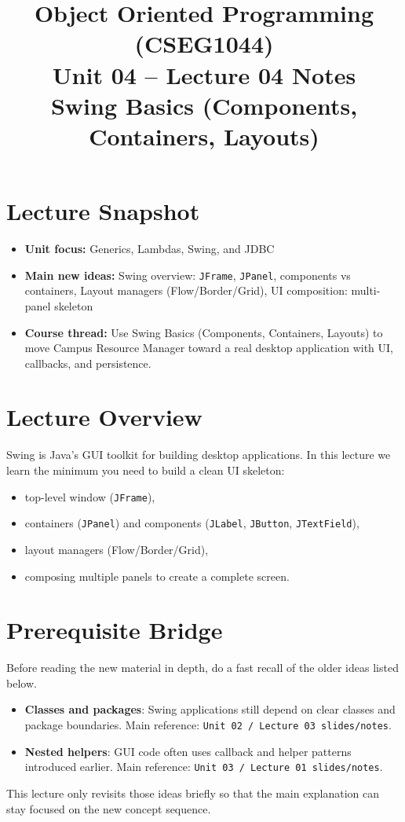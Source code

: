 \documentclass[11pt]{article}
\title{Object Oriented Programming (CSEG1044)\\Unit 04 -- Lecture 04 Notes\\Swing Basics (Components, Containers, Layouts)}
\begin{document}
\maketitle
\tableofcontents

\section{Lecture Snapshot}
\begin{itemize}
  \item \textbf{Unit focus:} Generics, Lambdas, Swing, and JDBC
  \item \textbf{Main new ideas:} Swing overview: \texttt{JFrame}, \texttt{JPanel}, components vs containers, Layout managers (Flow/Border/Grid), UI composition: multi-panel skeleton
  \item \textbf{Course thread:} Use Swing Basics (Components, Containers, Layouts) to move Campus Resource Manager toward a real desktop application with UI, callbacks, and persistence.
\end{itemize}
\notesources{\OOPSUnitIVSources}

\section{Lecture Overview}
Swing is Java's GUI toolkit for building desktop applications.
In this lecture we learn the minimum you need to build a clean UI skeleton:
\begin{itemize}
  \item top-level window (\texttt{JFrame}),
  \item containers (\texttt{JPanel}) and components (\texttt{JLabel}, \texttt{JButton}, \texttt{JTextField}),
  \item layout managers (Flow/Border/Grid),
  \item composing multiple panels to create a complete screen.
\end{itemize}
\notesources{\OOPSUnitIVSources}

\section{Prerequisite Bridge}
Before reading the new material in depth, do a fast recall of the older ideas listed below.
\begin{itemize}
  \item \textbf{Classes and packages}: Swing applications still depend on clear classes and package boundaries. Main reference: \texttt{Unit 02 / Lecture 03 slides/notes}.
  \item \textbf{Nested helpers}: GUI code often uses callback and helper patterns introduced earlier. Main reference: \texttt{Unit 03 / Lecture 01 slides/notes}.
\end{itemize}
This lecture only revisits those ideas briefly so that the main explanation can stay focused on the new concept sequence.
\notesources{\OOPSUnitIVSources}
\end{document}
